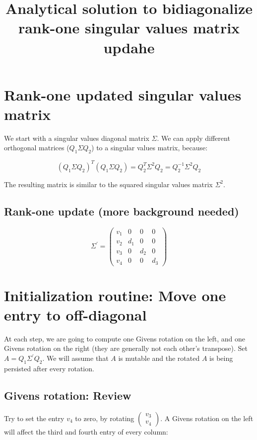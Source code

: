 \documentclass{article}
\title{Analytical solution to bidiagonalize rank-one singular values matrix updahe}
\begin{document}
\maketitle

\section{Rank-one updated singular values matrix}

We start with a singular values diagonal matrix $\Sigma$.
We can apply different orthogonal matrices ($Q_1 \Sigma Q_2$) to a singular values matrix, because:

$$
(Q_1 \Sigma Q_2)^T (Q_1 \Sigma Q_2)
=
Q_2^T \Sigma^2 Q_2
=
Q_2^{-1} \Sigma^2 Q_2
$$

The resulting matrix is similar to the squared singular values matrix $\Sigma^2$.

\subsection{Rank-one update (more background needed)}

$$
\Sigma^\prime =
\left(\begin{matrix}
    v_1 & 0 & 0 & 0 \\
    v_2 & d_1 & 0 & 0 \\
    v_3 & 0 & d_2 & 0 \\
    v_4 & 0 & 0 & d_3
\end{matrix}\right)
$$

\section{Initialization routine: Move one entry to off-diagonal}

At each step, we are going to compute one Givens rotation on the left, and one Givens rotation on the right (they are generally not each other's transpose). Set $A = Q_1 \Sigma^\prime Q_2$. We will assume that $A$ is mutable and the rotated $A$ is being persisted after every rotation.

\subsection{Givens rotation: Review}

Try to set the entry $v_4$ to zero, by rotating $\left(\begin{matrix}v_3\\v_4\end{matrix}\right)$. A Givens rotation on the left will affect the third and fourth entry of every column:
\end{document}
